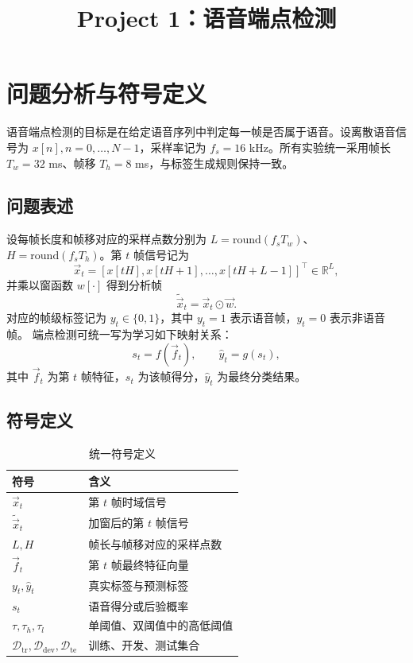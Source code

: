 \documentclass[a4paper]{article}
\title{Project 1：语音端点检测}
\begin{document}
\maketitle

\section{问题分析与符号定义}

语音端点检测的目标是在给定语音序列中判定每一帧是否属于语音。设离散语音信号为
$x[n], n=0,\dots,N-1$，采样率记为 $f_s=16$ kHz。所有实验统一采用帧长
$T_w=32$ ms、帧移 $T_h=8$ ms，与标签生成规则保持一致。

\subsection{问题表述}

设每帧长度和帧移对应的采样点数分别为
$L=\mathrm{round}(f_s T_w)$、$H=\mathrm{round}(f_s T_h)$。第 $t$ 帧信号记为
\begin{equation}
  \vec{x}_t = [x[tH],x[tH+1],\dots,x[tH+L-1]]^\top \in \mathbb{R}^{L},
\end{equation}
并乘以窗函数 $w[\cdot]$ 得到分析帧
\begin{equation}
  \tilde{\vec{x}}_t = \vec{x}_t \odot \vec{w}.
\end{equation}
对应的帧级标签记为 $y_t \in \{0,1\}$，其中 $y_t=1$ 表示语音帧，$y_t=0$ 表示非语音帧。
端点检测可统一写为学习如下映射关系：
\begin{equation}
  s_t = f(\vec{f}_t), \qquad \hat{y}_t = g(s_t),
\end{equation}
其中 $\vec{f}_t$ 为第 $t$ 帧特征，$s_t$ 为该帧得分，$\hat{y}_t$ 为最终分类结果。

\subsection{符号定义}
\begin{table}[ht]
  \caption{统一符号定义}
  \label{tab:symbols}
  \centering
  \small
  \begin{tabular}{ll}
    \toprule
    符号 & 含义 \\
    \midrule
    $\vec{x}_t$ & 第 $t$ 帧时域信号 \\
    $\tilde{\vec{x}}_t$ & 加窗后的第 $t$ 帧信号 \\
    $L,H$ & 帧长与帧移对应的采样点数 \\
    $\vec{f}_t$ & 第 $t$ 帧最终特征向量 \\
    $y_t,\hat{y}_t$ & 真实标签与预测标签 \\
    $s_t$ & 语音得分或后验概率 \\
    $\tau,\tau_h,\tau_l$ & 单阈值、双阈值中的高低阈值 \\
    $\mathcal{D}_{\text{tr}},\mathcal{D}_{\text{dev}},\mathcal{D}_{\text{te}}$ & 训练、开发、测试集合 \\
    \bottomrule
  \end{tabular}
\end{table}
\end{document}
